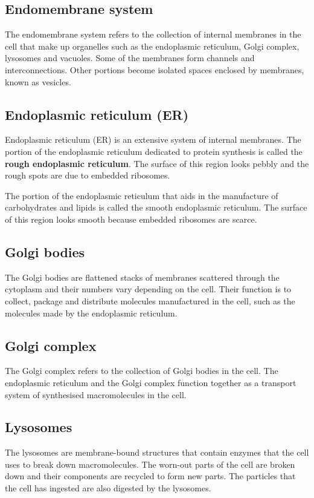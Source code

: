\documentclass[11pt]{article}
\begin{document}
\newpage
\subsection{Endomembrane system}
\label{sec:orgc93f174}
The endomembrane system refers to the collection of internal membranes in the cell that make up organelles such as the endoplasmic reticulum, Golgi complex, lysosomes and vacuoles. Some of the membranes form channels and interconnections. Other portions become isolated spaces enclosed by membranes, known as vesicles.
\subsection{Endoplasmic reticulum (ER)}
\label{sec:org8d5fb7c}
Endoplasmic reticulum (ER) is an extensive system of internal membranes. The portion of the endoplasmic reticulum dedicated to protein synthesis is called the \textbf{rough endoplasmic reticulum}. The surface of this region looks pebbly and the rough spots are due to embedded ribosomes.


The portion of the endoplasmic reticulum that aids in the manufacture of carbohydrates and lipids is called the smooth endoplasmic reticulum. The surface of this region looks smooth because embedded ribosomes are scarce.
\subsection{Golgi bodies}
\label{sec:orgba37ee2}
The Golgi bodies are flattened stacks of membranes scattered through the cytoplasm and their numbers vary depending on the cell. Their function is to collect, package and distribute molecules manufactured in the cell, such as the molecules made by the endoplasmic reticulum.
\subsection{Golgi complex}
\label{sec:org4623314}
The Golgi complex refers to the collection of Golgi bodies in the cell. The endoplasmic reticulum and the Golgi complex function together as a transport system of synthesised macromolecules in the cell.
\subsection{Lysosomes}
\label{sec:org0f2167f}
The lysosomes are membrane-bound structures that contain enzymes that the cell uses to break down macromolecules. The worn-out parts of the cell are broken down and their components are recycled to form new parts. The particles that the cell has ingested are also digested by the lysosomes.
\end{document}
